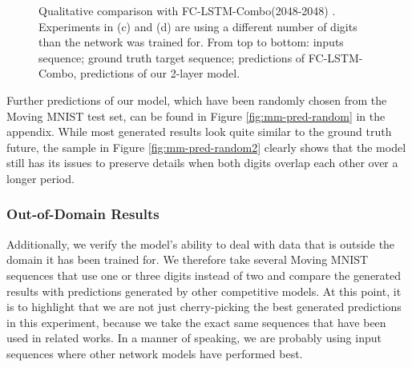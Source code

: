 \begin{figure}[h!tb]
\begin{subfigure}{0.49\textwidth}
  \caption{}
  \label{fig:mm-pred-spec-lstm4}
\end{subfigure}
\caption[Comparison with LSTM on Moving MNIST]{Qualitative comparison with FC-LSTM-Combo(2048-2048) \parencite{unsup_learn_lstm}. Experiments in (c) and (d) are using a different number of digits than the network was trained for. From top to bottom: inputs sequence; ground truth target sequence; predictions of FC-LSTM-Combo, predictions of our 2-layer model.} \label{fig:mm-pred-spec-lstm}
\end{figure}

Further predictions of our model, which have been randomly chosen from the Moving MNIST test set, can be found in Figure \ref{fig:mm-pred-random} in the appendix. While most generated results look quite similar to the ground truth future, the sample in Figure \ref{fig:mm-pred-random2} clearly shows that the model still has its issues to preserve details when both digits overlap each other over a longer period.


\subsubsection{Out-of-Domain Results}

Additionally, we verify the model's ability to deal with data that is outside the domain it has been trained for. We therefore take several Moving MNIST sequences that use one or three digits instead of two and compare the generated results with predictions generated by other competitive models. At this point, it is to highlight that we are not just cherry-picking the best generated predictions in this experiment, because we take the exact same sequences that have been used in related works. In a manner of speaking, we are probably using input sequences where other network models have performed best.

